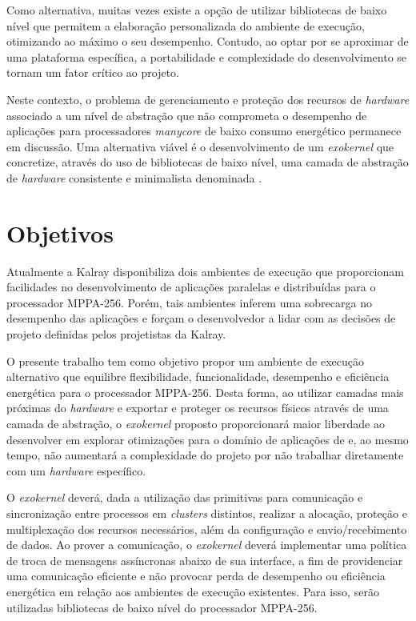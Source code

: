 \documentclass[
	12pt,				%
	openright,			%
	twoside,			%
	a4paper,			%
	english,			%
	brazil,				%
	]{abntex2}
\begin{document}
    Como alternativa, muitas vezes existe a opção de utilizar bibliotecas
    de baixo nível que permitem a elaboração personalizada do ambiente de
    execução, otimizando ao máximo o seu desempenho. Contudo, ao optar por se
    aproximar de uma plataforma específica, a portabilidade e complexidade do
    desenvolvimento se tornam um fator crítico ao projeto.
    
    Neste contexto, o problema de gerenciamento e proteção dos recursos de
    \textit{hardware} associado a um nível de abstração que não comprometa o desempenho
    de aplicações para processadores \textit{manycore} de baixo consumo
    energético permanece em discussão.
    Uma alternativa viável é o desenvolvimento de um \textit{exokernel} que
    concretize, através do uso de bibliotecas de baixo nível, uma camada de
    abstração de \textit{hardware} consistente e minimalista denominada \hal.

\chapter{Objetivos}
\label{cap:objetivos}

    Atualmente a Kalray disponibiliza dois ambientes de execução que
    proporcionam facilidades no desenvolvimento de aplicações paralelas
    e distribuídas para o processador MPPA-256.
    Porém, tais ambientes inferem uma sobrecarga no desempenho das aplicações
    e forçam o desenvolvedor a lidar com as decisões de projeto definidas
    pelos projetistas da Kalray.
    
    O presente trabalho tem como objetivo propor um ambiente de execução alternativo que
    equilibre flexibilidade, funcionalidade, desempenho e eficiência energética
    para o processador MPPA-256.
    Desta forma, ao utilizar camadas mais próximas do \textit{hardware} e exportar e
    proteger os recursos físicos através de uma camada de abstração,
    o \textit{exokernel} proposto proporcionará maior liberdade ao
    desenvolver em explorar otimizações para o domínio de aplicações de \hpc e,
    ao mesmo tempo, não aumentará a complexidade do projeto por
    não trabalhar diretamente com um \textit{hardware} específico.
    
    O \textit{exokernel} deverá, dada a utilização das primitivas \ipc para
    comunicação e sincronização entre processos em \textit{clusters} distintos,
    realizar a alocação, proteção e multiplexação dos recursos necessários, 
    além da configuração e envio/recebimento de dados.
    Ao prover a comunicação, o \textit{exokernel} deverá implementar uma 
    política de troca de mensagens assíncronas abaixo de sua interface, 
    a fim de providenciar uma comunicação eficiente e não provocar perda de
    desempenho ou eficiência energética em relação aos ambientes de execução
    existentes.
    Para isso, serão utilizadas bibliotecas de baixo nível do processador MPPA-256.
    
\end{document}

